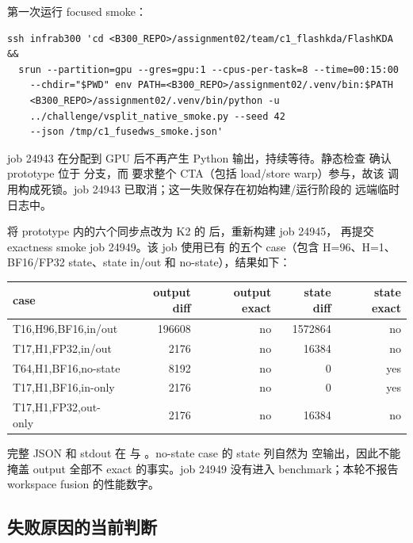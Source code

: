 第一次运行 focused smoke：

\begin{lstlisting}
ssh infrab300 'cd <B300_REPO>/assignment02/team/c1_flashkda/FlashKDA &&
  srun --partition=gpu --gres=gpu:1 --cpus-per-task=8 --time=00:15:00
    --chdir="$PWD" env PATH=<B300_REPO>/assignment02/.venv/bin:$PATH
    <B300_REPO>/assignment02/.venv/bin/python -u
    ../challenge/vsplit_native_smoke.py --seed 42
    --json /tmp/c1_fusedws_smoke.json'
\end{lstlisting}

job 24943 在分配到 GPU 后不再产生 Python 输出，持续等待。静态检查
确认 prototype 位于  分支，而
 要求整个 CTA（包括 load/store warp）参与，故该
调用构成死锁。job 24943 已取消；这一失败保存在初始构建/运行阶段的
远端临时日志中。

将 prototype 内的六个同步点改为 K2 的
 后，重新构建 job 24945，
再提交 exactness smoke job 24949。该 job 使用已有
 的五个 case（包含 H=96、H=1、BF16/FP32
state、state in/out 和 no-state），结果如下：

\begin{center}
\small
\begin{tabular}{@{}l r r r r@{}}
\toprule
case & output diff & output exact & state diff & state exact \\
\midrule
T16,H96,BF16,in/out & 196608 & no & 1572864 & no \\
T17,H1,FP32,in/out & 2176 & no & 16384 & no \\
T64,H1,BF16,no-state & 8192 & no & 0 & yes \\
T17,H1,BF16,in-only & 2176 & no & 0 & yes \\
T17,H1,FP32,out-only & 2176 & no & 16384 & no \\
\bottomrule
\end{tabular}
\end{center}

完整 JSON 和 stdout 在
 与
。no-state case 的 state 列自然为
空输出，因此不能掩盖 output 全部不 exact 的事实。job 24949 没有进入
benchmark；本轮不报告 workspace fusion 的性能数字。

\subsection{失败原因的当前判断}

